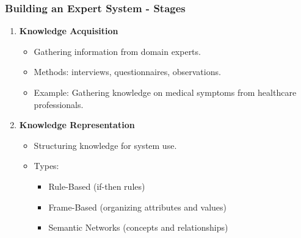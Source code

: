 \documentclass[aspectratio=169]{beamer}
\begin{document}
\begin{frame}[fragile]
    \frametitle{Building an Expert System - Stages}
    \begin{enumerate}
        \item \textbf{Knowledge Acquisition}
        \begin{itemize}
            \item Gathering information from domain experts.
            \item Methods: interviews, questionnaires, observations.
            \item Example: Gathering knowledge on medical symptoms from healthcare professionals.
        \end{itemize}
        
        \item \textbf{Knowledge Representation}
        \begin{itemize}
            \item Structuring knowledge for system use.
            \item Types:
            \begin{itemize}
                \item Rule-Based (if-then rules)
                \item Frame-Based (organizing attributes and values)
                \item Semantic Networks (concepts and relationships)
            \end{itemize}
        \end{itemize}
    \end{enumerate}
\end{frame}
\end{document}
